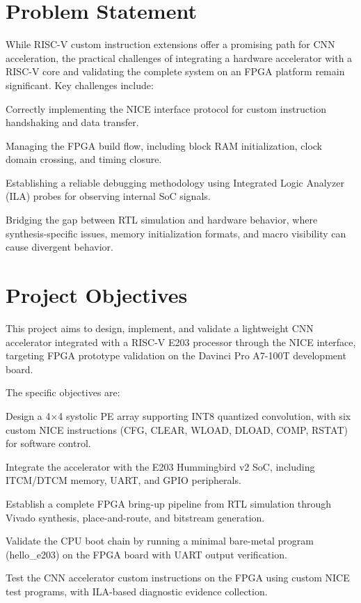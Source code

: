 \section{Problem Statement}\label{sec:1_3}

While RISC-V custom instruction extensions offer a promising path for CNN acceleration, the practical challenges of integrating a hardware accelerator with a RISC-V core and validating the complete system on an FPGA platform remain significant. Key challenges include:


Correctly implementing the NICE interface protocol for custom instruction handshaking and data transfer.


Managing the FPGA build flow, including block RAM initialization, clock domain crossing, and timing closure.


Establishing a reliable debugging methodology using Integrated Logic Analyzer (ILA) probes for observing internal SoC signals.


Bridging the gap between RTL simulation and hardware behavior, where synthesis-specific issues, memory initialization formats, and macro visibility can cause divergent behavior.


\section{Project Objectives}\label{sec:1_4}

This project aims to design, implement, and validate a lightweight CNN accelerator integrated with a RISC-V E203 processor through the NICE interface, targeting FPGA prototype validation on the Davinci Pro A7-100T development board.


The specific objectives are:


Design a 4×4 systolic PE array supporting INT8 quantized convolution, with six custom NICE instructions (CFG, CLEAR, WLOAD, DLOAD, COMP, RSTAT) for software control.


Integrate the accelerator with the E203 Hummingbird v2 SoC, including ITCM/DTCM memory, UART, and GPIO peripherals.


Establish a complete FPGA bring-up pipeline from RTL simulation through Vivado synthesis, place-and-route, and bitstream generation.


Validate the CPU boot chain by running a minimal bare-metal program (hello\_e203) on the FPGA board with UART output verification.


Test the CNN accelerator custom instructions on the FPGA using custom NICE test programs, with ILA-based diagnostic evidence collection.


